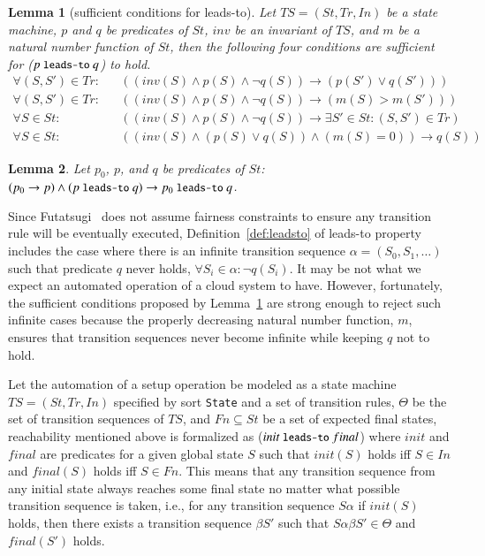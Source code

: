 \documentclass[12pt]{report}
\newtheorem{lemma}{Lemma}
\newcommand{\ra}{\rightarrow}
\newcommand{\mbstt}[1]{\mbox{\small{\tt {#1}}}}
\begin{document}
\begin{lemma}[sufficient conditions for leads-to]
\label{def:sufcond}
  Let $TS=(St,Tr,In)$ be a state machine, $p$ and $q$ be predicates of
  $St$, $inv$ be an invariant of $TS$, and $m$ be a natural number
  function of $St$, then the following four conditions are sufficient
  for ($p~\mbstt{leads-to}~q$) to hold.
\begin{eqnarray*}
\forall (S,S')\in Tr:&&((inv(S)\land p(S)\land\neg q(S))\ra(p(S')\lor q(S')))\\
\forall (S,S')\in Tr:&&((inv(S)\land p(S)\land\neg q(S))\ra(m(S) > m(S')))\\
\forall S\in St:&&((inv(S)\land p(S)\land\neg q(S))\ra\exists S'\in St:(S,S')\in Tr)\\
\forall S\in St:&&((inv(S)\land (p(S)\lor q(S))\land(m(S) = 0)) \ra q(S))
\end{eqnarray*}
\end{lemma}

\begin{lemma}
  Let $p_0$, $p$, and $q$ be predicates of $St$:
  $(p_0 \ra p) \land (p~\mbstt{leads-to}~q) \ra
  p_0~\mbstt{leads-to}~q$.
\end{lemma}
Since Futatsugi~\cite{Futatsugi15} does not assume fairness
constraints to ensure any transition rule will be eventually executed,
Definition~\ref{def:leadsto} of leads-to property includes the case
where there is an infinite transition sequence
$\alpha=(S_0,S_1,\dots)$ such that predicate $q$ never holds, $\forall
S_i\in\alpha:\neg q(S_i)$. It may be not what we expect an automated
operation of a cloud system to have. However, fortunately, the
sufficient conditions proposed by Lemma~\ref{def:sufcond} are strong
enough to reject such infinite cases because the properly decreasing
natural number function, $m$, ensures that transition sequences never
become infinite while keeping $q$ not to hold.

Let the automation of a setup operation be modeled as a state machine
$TS=(St,Tr,In)$ specified by sort {\tt State} and a set of transition
rules, $\Theta$ be the set of transition sequences of $TS$, and
$Fn\subseteq St$ be a set of expected final states, reachability
mentioned above is formalized as ($init~\mbstt{leads-to}~final$) where
$init$ and $final$ are predicates for a given global state $S$ such
that $init(S)$ holds iff $S \in In$ and $final(S)$ holds iff $S \in
Fn$. This means that any transition sequence from any initial state
always reaches some final state no matter what possible transition
sequence is taken, i.e., for any transition sequence $S\alpha$ if
$init(S)$ holds, then there exists a transition sequence $\beta S'$
such that $S\alpha\beta S'\in\Theta$ and $final(S')$ holds.
\end{document}
